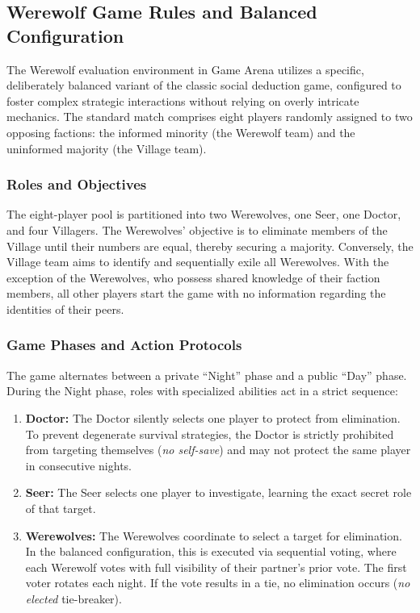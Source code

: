 \documentclass{article}
\begin{document}
\subsection{Werewolf Game Rules and Balanced Configuration}
\label{app:werewolf_rules}

The Werewolf evaluation environment in Game Arena utilizes a specific, deliberately balanced variant of the classic social deduction game, configured to foster complex strategic interactions without relying on overly intricate mechanics. The standard match comprises eight players randomly assigned to two opposing factions: the informed minority (the Werewolf team) and the uninformed majority (the Village team).

\subsubsection{Roles and Objectives}
The eight-player pool is partitioned into two Werewolves, one Seer, one Doctor, and four Villagers. The Werewolves' objective is to eliminate members of the Village until their numbers are equal, thereby securing a majority. Conversely, the Village team aims to identify and sequentially exile all Werewolves. With the exception of the Werewolves, who possess shared knowledge of their faction members, all other players start the game with no information regarding the identities of their peers.

\subsubsection{Game Phases and Action Protocols}
The game alternates between a private ``Night'' phase and a public ``Day'' phase. 
During the Night phase, roles with specialized abilities act in a strict sequence:
\begin{enumerate}
    \item \textbf{Doctor:} The Doctor silently selects one player to protect from elimination. To prevent degenerate survival strategies, the Doctor is strictly prohibited from targeting themselves (\textit{no self-save}) and may not protect the same player in consecutive nights.
    \item \textbf{Seer:} The Seer selects one player to investigate, learning the exact secret role of that target.
    \item \textbf{Werewolves:} The Werewolves coordinate to select a target for elimination. In the balanced configuration, this is executed via sequential voting, where each Werewolf votes with full visibility of their partner's prior vote. The first voter rotates each night. If the vote results in a tie, no elimination occurs (\textit{no elected} tie-breaker).
\end{enumerate}
\end{document}
